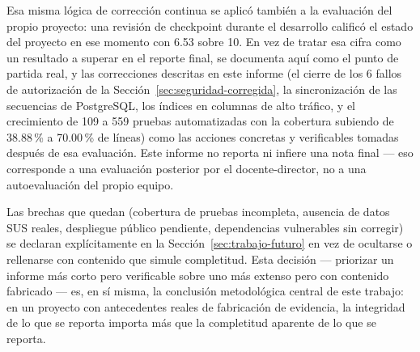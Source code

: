 Esa misma lógica de corrección continua se aplicó también a la evaluación del propio proyecto: una
revisión de checkpoint durante el desarrollo calificó el estado del proyecto en ese momento con 6.53
sobre 10. En vez de tratar esa cifra como un resultado a superar en el reporte final, se documenta aquí
como el punto de partida real, y las correcciones descritas en este informe (el cierre de los 6 fallos de
autorización de la Sección~\ref{sec:seguridad-corregida}, la sincronización de las secuencias de
PostgreSQL, los índices en columnas de alto tráfico, y el crecimiento de 109 a 559 pruebas automatizadas
con la cobertura subiendo de 38.88\,\% a 70.00\,\% de líneas) como las acciones concretas y verificables
tomadas después de esa evaluación. Este informe no reporta ni infiere una nota final --- eso corresponde
a una evaluación posterior por el docente-director, no a una autoevaluación del propio equipo.

Las brechas que quedan (cobertura de pruebas incompleta, ausencia de datos SUS reales, despliegue público
pendiente, dependencias vulnerables sin corregir) se declaran explícitamente en la
Sección~\ref{sec:trabajo-futuro} en vez de ocultarse o rellenarse con contenido que simule completitud.
Esta decisión --- priorizar un informe más corto pero verificable sobre uno más extenso pero con
contenido fabricado --- es, en sí misma, la conclusión metodológica central de este trabajo: en un
proyecto con antecedentes reales de fabricación de evidencia, la integridad de lo que se reporta importa
más que la completitud aparente de lo que se reporta.
\newpage
